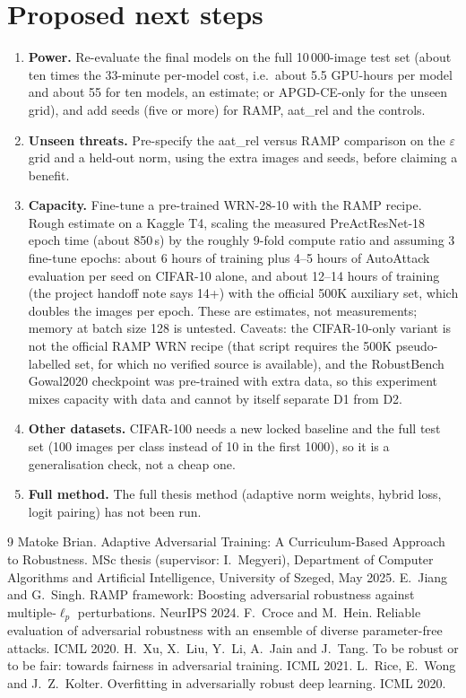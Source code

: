 \documentclass[11pt]{article}
\begin{document}
\section{Proposed next steps}
\begin{enumerate}
\item \textbf{Power.} Re-evaluate the final models on the full 10\,000-image test set (about ten times the 33-minute per-model cost, i.e.\ about 5.5 GPU-hours per model and about 55 for ten models, an estimate; or APGD-CE-only for the unseen grid), and add seeds (five or more) for RAMP, aat\_rel and the controls.
\item \textbf{Unseen threats.} Pre-specify the aat\_rel versus RAMP comparison on the $\varepsilon$ grid and a held-out norm, using the extra images and seeds, before claiming a benefit.
\item \textbf{Capacity.} Fine-tune a pre-trained WRN-28-10 with the RAMP recipe. Rough estimate on a Kaggle T4, scaling the measured PreActResNet-18 epoch time (about 850\,s) by the roughly 9-fold compute ratio and assuming 3 fine-tune epochs: about 6 hours of training plus 4--5 hours of AutoAttack evaluation per seed on CIFAR-10 alone, and about 12--14 hours of training (the project handoff note says 14+) with the official 500K auxiliary set, which doubles the images per epoch. These are estimates, not measurements; memory at batch size 128 is untested. Caveats: the CIFAR-10-only variant is not the official RAMP WRN recipe (that script requires the 500K pseudo-labelled set, for which no verified source is available), and the RobustBench Gowal2020 checkpoint was pre-trained with extra data, so this experiment mixes capacity with data and cannot by itself separate D1 from D2.
\item \textbf{Other datasets.} CIFAR-100 needs a new locked baseline and the full test set (100 images per class instead of 10 in the first 1000), so it is a generalisation check, not a cheap one.
\item \textbf{Full method.} The full thesis method (adaptive norm weights, hybrid loss, logit pairing) has not been run.
\end{enumerate}

\begin{thebibliography}{9}
 Matoke Brian. Adaptive Adversarial Training: A Curriculum-Based Approach to Robustness. MSc thesis (supervisor: I.~Megyeri), Department of Computer Algorithms and Artificial Intelligence, University of Szeged, May 2025.
 E.~Jiang and G.~Singh. RAMP framework: Boosting adversarial robustness against multiple-$\ell_p$ perturbations. NeurIPS 2024.
 F.~Croce and M.~Hein. Reliable evaluation of adversarial robustness with an ensemble of diverse parameter-free attacks. ICML 2020.
 H.~Xu, X.~Liu, Y.~Li, A.~Jain and J.~Tang. To be robust or to be fair: towards fairness in adversarial training. ICML 2021.
 L.~Rice, E.~Wong and J.~Z.~Kolter. Overfitting in adversarially robust deep learning. ICML 2020.
\end{thebibliography}
\end{document}
